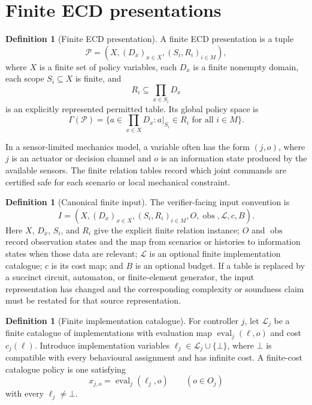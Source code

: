 \documentclass[11pt]{article}
\theoremstyle{plain}
\theoremstyle{definition}
\newtheorem{definition}[theorem]{Definition}
\theoremstyle{remark}
\begin{document}
\section{Finite ECD presentations}
\label{sec:finite-presentations}

\begin{definition}[Finite ECD presentation]
A finite ECD presentation is a tuple
\[
  \mathcal P=(X,(D_x)_{x\in X},(S_i,R_i)_{i\in M}),
\]
where \(X\) is a finite set of policy variables, each \(D_x\) is a finite
nonempty domain, each scope \(S_i\subseteq X\) is finite, and
\[
  R_i\subseteq\prod_{x\in S_i}D_x
\]
is an explicitly represented permitted table.  Its global policy space is
\[
  \Gamma(\mathcal P)=
  \{a\in\prod_{x\in X}D_x: a|_{S_i}\in R_i\text{ for all }i\in M\}.
\]
\end{definition}

In a sensor-limited mechanics model, a variable often has the form \((j,o)\),
where \(j\) is an actuator or decision channel and \(o\) is an information state
produced by the available sensors.  The finite relation tables record which
joint commands are certified safe for each scenario or local mechanical
constraint.

\begin{definition}[Canonical finite input]
The verifier-facing input convention is
\[
I=(X,(D_x)_{x\in X},(S_i,R_i)_{i\in M},O,\operatorname{obs},
\mathcal L,c,B).
\]
Here \(X\), \(D_x\), \(S_i\), and \(R_i\) give the explicit finite relation
instance; \(O\) and \(\operatorname{obs}\) record observation states and the map
from scenarios or histories to information states when those data are relevant;
\(\mathcal L\) is an optional finite implementation catalogue; \(c\) is its cost
map; and \(B\) is an optional budget.  If a table is replaced by a succinct
circuit, automaton, or finite-element generator, the input representation has
changed and the corresponding complexity or soundness claim must be restated for
that source representation.
\end{definition}

\begin{definition}[Finite implementation catalogue]
For controller \(j\), let \(\mathcal L_j\) be a finite catalogue of
implementations with evaluation map \(\operatorname{eval}_j(\ell,o)\) and cost
\(c_j(\ell)\).  Introduce implementation variables
\(\ell_j\in\mathcal L_j\cup\{\bot\}\), where \(\bot\) is compatible with every
behavioural assignment and has infinite cost.  A finite-cost catalogue policy is
one satisfying
\[
  x_{j,o}=\operatorname{eval}_j(\ell_j,o)
  \qquad(o\in O_j)
\]
with every \(\ell_j\ne\bot\).
\end{definition}
\end{document}
